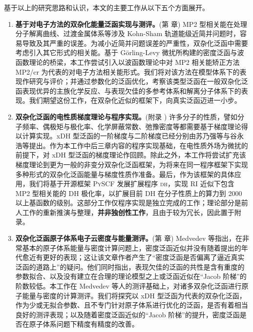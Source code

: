 基于以上的研究思路和认识，本文的主要工作从以下五个方面展开。
\begin{enumerate}[nosep]
  \item \textbf{基于对电子方法的双杂化能量泛函实现与测评。}(第  章) MP2 型相关能在处理分子解离曲线、过渡金属体系等涉及 Kohn-Sham 轨道能级近简并问题时，容易导致及其严重的误差。为减小近简并问题误差的严重性，双杂化泛函中需要考虑引入其它形式的相关能。基于 G\"orling-Levy 微扰所构建的密度泛函与波函数理论的桥梁，本工作尝试引入以波函数理论中对 MP2 相关能矫正方法 MP2/cr\cite{Dykstra-Davidson.IJQC.2000} 为代表的对电子方法相关能形式。我们将对该方法在模型体系下的表现作研究与评价；并通过参数化的泛函优化，考察该类型泛函在一般双杂化泛函表现优异的主族化学反应、与表现欠佳的多参考体系和解离分子体系下的表现。我们期望这份工作，在双杂化近似的框架下，向真实泛函迈进一小步。

  \item \textbf{双杂化泛函的电性质梯度理论与程序实现。}(附录 ) 许多分子的性质，譬如分子频率、偶极矩与极化率、化学屏蔽常数、弛豫密度等都需要基于梯度理论得以计算实现。xDH 型泛函的一阶梯度与二阶梯度已经分别由苏乃强等\cite{Su-Xu.SCC.2013}与谷永浩等\cite{Gu-Xu.JCTC.2021}提出。作为本工作中后三章内容的程序实现基础，在电性质外场为微扰的前提下，对 xDH 型泛函的梯度理论作回顾。除此之外，本工作将尝试扩充该梯度理论到更为一般的非变分双杂化泛函框架，为将来在同一程序框架下实现多种形式的双杂化泛函能量与梯度性质作准备。最后，作为该框架的具体应用，我们将基于开源框架 \textsc{PySCF} 发展扩展程序 \textsc{dh}，实现 RI 近似下包含 MP2 型相关能的 DH 极化率，以扩展目前 DH 在分子性质上的算力到 2000 以上基函数的级别。这部分工作仅程序实现是独立完成的工作；理论部分是前人工作的重新推演与整理，\textbf{并非独创性工作}，且由于较为冗长，因此置于附录。
  
  \item \textbf{双杂化泛函原子体系电子云密度与能量测评。}(第  章) Medvedev 等指出，在非常基本的原子体系能量与密度计算问题上，密度泛函近似并没有随着提出的年代愈近有更好的表现\cite{Medvedev-Lyssenko.S.2017}；这让该文章作者产生了“密度泛函是否偏离了逼近真实泛函的道路上”的疑问。他们同时指出，表现欠佳的泛函的共性是含有重度的参数拟合、以及没有建立在合理的理论模型之上或泛函近似在“Jacob 阶梯”的阶数较低。本工作在 Medvedev 等人的测评基础上，对诸多双杂化泛函进行原子能量与密度的计算测评。我们将探究以 xDH 型泛函为代表的双杂化泛函，作为少或无拟合参数、且不专门针对原子体系进行优化的泛函，是否有着相当良好的测评表现；以及随着密度泛函近似的“Jacob 阶梯”的提升，密度泛函是否在原子体系问题下精度有精度的改善。
  

\end{enumerate}
